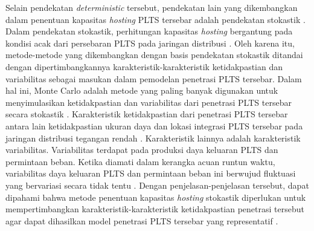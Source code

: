 Selain pendekatan \textit{deterministic} tersebut, pendekatan lain yang dikembangkan dalam penentuan kapasitas \textit{hosting} PLTS tersebar adalah pendekatan stokastik \cite{Breker2015,Kolenc2015,Bollen2017}. Dalam pendekatan stokastik, perhitungan kapasitas \textit{hosting} bergantung pada kondisi acak dari persebaran PLTS pada jaringan distribusi \cite{Breker2015}. Oleh karena itu, metode-metode yang dikembangkan dengan basis pendekatan stokastik ditandai dengan dipertimbangkannya karakteristik-karakteristik ketidakpastian dan variabilitas sebagai masukan dalam pemodelan penetrasi PLTS tersebar. Dalam hal ini, Monte Carlo adalah metode yang paling banyak digunakan untuk menyimulasikan ketidakpastian dan variabilitas dari penetrasi PLTS tersebar secara stokastik \cite{Torquato2018,Gooding2014,Dubey2017,Wang2020,Bollen2017,Reno2016,Epri2012,Kolenc2015}. Karakteristik ketidakpastian dari penetrasi PLTS tersebar antara lain ketidakpastian ukuran daya dan lokasi integrasi PLTS tersebar pada jaringan distribusi tegangan rendah \cite{Dubey2015,Epri2012,Ding2017,Dubey2017}. %
Karakteristik lainnya adalah karakteristik variabilitas. Variabilitas terdapat pada produksi daya keluaran PLTS dan permintaan beban. Ketika diamati dalam kerangka acuan runtun waktu, variabilitas daya keluaran PLTS dan permintaan beban ini berwujud fluktuasi yang bervariasi secara tidak tentu \cite{Behravesh2018,Wang2020}. Dengan penjelasan-penjelasan tersebut, dapat dipahami bahwa metode penentuan kapasitas \textit{hosting} stokastik diperlukan untuk mempertimbangkan karakteristik-karakteristik ketidakpastian penetrasi tersebut agar dapat dihasilkan model penetrasi PLTS tersebar yang representatif \cite{Gooding2014,Dubey2017,Wang2020}.


